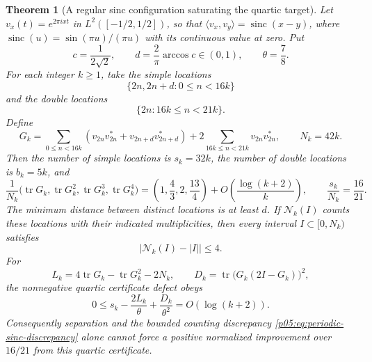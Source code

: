 \documentclass[11pt,letterpaper]{article}
\newtheorem{theorem}{Theorem}[section]
\theoremstyle{definition}
\theoremstyle{remark}
\newcommand{\1}{\mathbf 1}
\begin{document}
\begin{theorem}[A regular sinc configuration saturating the quartic target]
\label{p05:thm:periodic-sinc-barrier}
Let $v_x(t)=e^{2\pi ixt}$ in $L^2([-1/2,1/2])$, so that
$\langle v_x,v_y\rangle=\operatorname{sinc}(x-y)$, where
$\operatorname{sinc}(u)=\sin(\pi u)/(\pi u)$ with its continuous
value at zero. Put
\[
 c=\frac1{2\sqrt2},\qquad
 d=\frac2\pi\arccos c\in(0,1),\qquad \theta=\frac78.
\]
For each integer $k\ge1$, take the simple locations
\[
 \{2n,2n+d:0\le n<16k\}
\]
and the double locations
\[
 \{2n:16k\le n<21k\}.
\]
Define
\[
 G_k=\sum_{0\le n<16k}
       (v_{2n}v_{2n}^*+v_{2n+d}v_{2n+d}^*)
       +2\sum_{16k\le n<21k}v_{2n}v_{2n}^*,
 \qquad N_k=42k.
\]
Then the number of simple locations is $s_k=32k$, the number of
double locations is $b_k=5k$, and
\begin{equation}\label{p05:eq:periodic-sinc-moments}
 \frac1{N_k}\bigl(\operatorname{tr}G_k,
    \operatorname{tr}G_k^2,\operatorname{tr}G_k^3,
    \operatorname{tr}G_k^4\bigr)
 =\left(1,\frac43,2,\frac{13}4\right)
       +O\left(\frac{\log(k+2)}k\right),
 \qquad \frac{s_k}{N_k}=\frac{16}{21}.
\end{equation}
The minimum distance between distinct locations is at least $d$.
If $\mathcal N_k(I)$ counts these locations with their indicated
multiplicities, then every interval $I\subset[0,N_k)$ satisfies
\begin{equation}\label{p05:eq:periodic-sinc-discrepancy}
 |\mathcal N_k(I)-|I||\le4.
\end{equation}
For
\[
 L_k=4\operatorname{tr}G_k-\operatorname{tr}G_k^2-2N_k,
 \qquad D_k=\operatorname{tr}\bigl(G_k(2I-G_k)\bigr)^2,
\]
the nonnegative quartic certificate defect obeys
\begin{equation}\label{p05:eq:periodic-sinc-defect}
 0\le s_k-\frac{2L_k}{\theta}+\frac{D_k}{\theta^2}
       =O(\log(k+2)).
\end{equation}
Consequently separation and the bounded counting discrepancy
\eqref{p05:eq:periodic-sinc-discrepancy} alone cannot force a positive
normalized improvement over $16/21$ from this quartic certificate.
\end{theorem}
\end{document}
